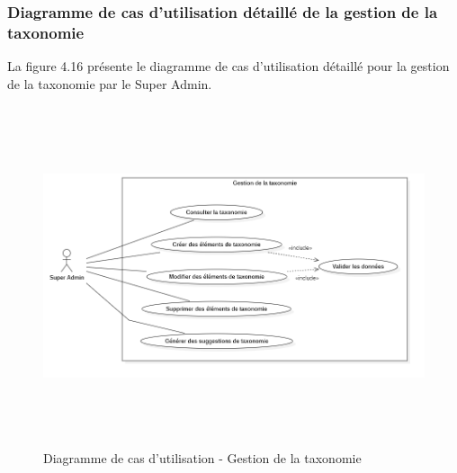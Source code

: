 \subsubsection{Diagramme de cas d'utilisation détaillé de la gestion de la taxonomie}
\noindent La figure 4.16 présente le diagramme de cas d'utilisation détaillé pour la gestion de la taxonomie par le Super Admin.

\begin{figure}[H]
    \centering
    \includegraphics[width=15cm,height=10cm]{images/taxonomyuc.png}
    \caption{Diagramme de cas d'utilisation - Gestion de la taxonomie}
\end{figure}

